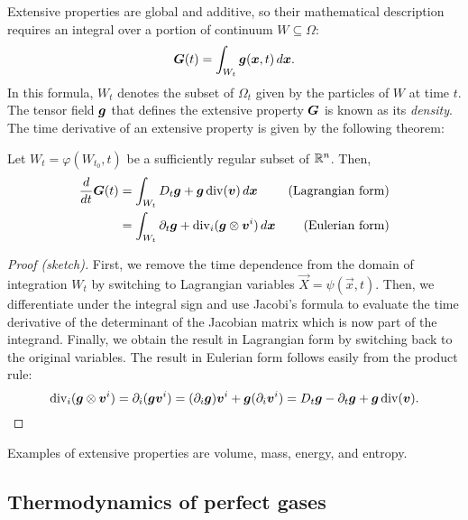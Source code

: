 Extensive properties are global and additive, so their mathematical
description requires an integral over a portion of continuum
$W \subseteq \Omega$:
\begin{equation} \label{eq:definizione-estensiva}
\bm{G}(t) = \int_{W_t} \bm{g}(\bm{x},t) \, d\bm{x}.
\end{equation}
In this formula, $W_t$ denotes the subset of $\Omega_t$ given by
the particles of $W$ at time $t$. The tensor field $\bm{g}$ that defines
the extensive property $\bm{G}$ is known as its \emph{density}.
The time derivative of an extensive property is given by the following theorem:

\begin{theo} \label{teor:reynolds}
Let $W_t = \varphi(W_{t_0},t)$ be a sufficiently regular subset of $\mathbb{R}^n$.
Then,
\begin{align*}
\frac{d}{dt} \bm{G}(t)
&= \int_{W_t} D_t \bm{g} + \bm{g} \operatorname{div}(\bm{v}) \, d\bm{x}
	& \text{(Lagrangian form)} \\
&= \int_{W_t} \partial_t \bm{g} + \operatorname{div}_i(\bm{g} \otimes \bm{v}^i) \, d\bm{x}
	& \text{(Eulerian form)}
\end{align*}
\end{theo}

\begin{proof}[Proof (sketch)]
First, we remove the time dependence from the domain of integration $W_t$
by switching to Lagrangian variables $\vec{X} = \psi(\vec{x},t)$.
Then, we differentiate under the integral sign and use Jacobi's formula
to evaluate the time derivative of the determinant of the Jacobian matrix
which is now part of the integrand.
Finally, we obtain the result in Lagrangian form by switching back to
the original variables. The result in Eulerian form follows easily
from the product rule:
\[
\operatorname{div}_i(\bm{g} \otimes \bm{v}^i)
= \partial_i (\bm{g} \bm{v}^i)
= (\partial_i \bm{g}) \bm{v}^i + \bm{g} (\partial_i \bm{v}^i)
= D_t \bm{g} - \partial_t \bm{g} + \bm{g} \operatorname{div}(\bm{v}). \qedhere
\]
\end{proof}
\noindent Examples of extensive properties are volume, mass, energy, and entropy.

\subsection*{Thermodynamics of perfect gases}

